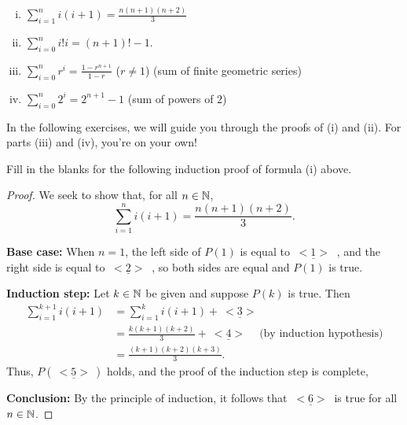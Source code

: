 \begin{enumerate}[(i)]
\item 
$\sum_{i=1}^n i(i+1)=\frac{n(n+1)(n+2)}{3}$ 
\item
$\sum_{i=0}^n i! i = (n+1)!-1$. 
\item
$\sum_{i=0}^n r^i=\frac{1-r^{n+1}}{1-r}$ ($r\not=1$)
(sum of finite geometric series)
\item 
$\sum_{i=0}^n 2^i=2^{n+1}-1$ (sum of powers of $2$)
\end{enumerate}

In the following exercises, we will guide you through the proofs of (i) and (ii). For parts (iii) and (iv), you're on your own!

\begin{exercise}{}
Fill in the blanks for the following induction proof of formula (i) above.

\begin{proof}
We seek to show that, for all $n\in\mathbb{N}$,  
\[
\sum_{i=1}^n i(i+1)=\frac{n(n+1)(n+2)}{3}. 
\tag{ 	$P(n)$}
\]

\noindent
\textbf{Base case:} When $n=1$, the left side of $P(1)$ is equal to $\underline{~<1>~}$ ,
and the
right side is equal to $\underline{~<2>~}$ , so both sides are equal and $P(1)$ is
true.

\noindent
\textbf{Induction step:} Let $k\in\mathbb{N}$ be given and suppose 
$P(k)$ is true. Then
\begin{align*}
\sum_{i=1}^{k+1}i(i+1)
&=
\sum_{i=1}^{k}i(i+1)
+\underline{~<3>~}
\\
&=\frac{k(k+1)(k+2)}{3} 
+\underline{~<4>~} 
\quad \text{(by induction hypothesis)}
\\
&=\frac{(k+1)(k+2)(k+3)}{3}.
\end{align*}
Thus, $P(\underline{~<5>~})$ holds, and the proof of the induction step is complete, 

\noindent
\textbf{Conclusion:}
By the principle of induction,  it follows that
$\underline{~<6>~}$  is true for all $n\in\mathbb{N}$.  
\end{proof}

\end{exercise}

